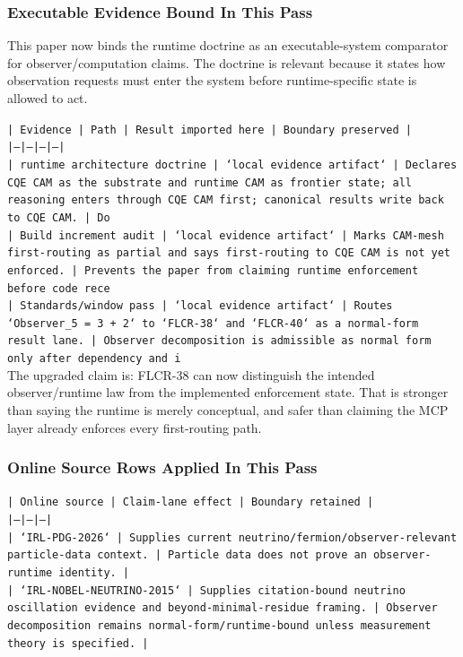 \documentclass[11pt]{article}
\begin{document}
\subsubsection*{Executable Evidence Bound In This Pass}

This paper now binds the runtime doctrine as an executable-system comparator for observer/computation claims. The doctrine is relevant because it states how observation requests must enter the system before runtime-specific state is allowed to act.

\noindent\texttt{| Evidence | Path | Result imported here | Boundary preserved |}\\
\noindent\texttt{|---|---|---|---|}\\
\noindent\texttt{| runtime architecture doctrine | `local evidence artifact` | Declares CQE CAM as the substrate and runtime CAM as frontier state; all reasoning enters through CQE CAM first; canonical results write back to CQE CAM. | Do}\\
\noindent\texttt{| Build increment audit | `local evidence artifact` | Marks CAM-mesh first-routing as partial and says first-routing to CQE CAM is not yet enforced. | Prevents the paper from claiming runtime enforcement before code rece}\\
\noindent\texttt{| Standards/window pass | `local evidence artifact` | Routes `Observer\_5 = 3 + 2` to `FLCR-38` and `FLCR-40` as a normal-form result lane. | Observer decomposition is admissible as normal form only after dependency and i}\\

The upgraded claim is: FLCR-38 can now distinguish the intended observer/runtime law from the implemented enforcement state. That is stronger than saying the runtime is merely conceptual, and safer than claiming the MCP layer already enforces every first-routing path.

\subsubsection*{Online Source Rows Applied In This Pass}

\noindent\texttt{| Online source | Claim-lane effect | Boundary retained |}\\
\noindent\texttt{|---|---|---|}\\
\noindent\texttt{| `IRL-PDG-2026` | Supplies current neutrino/fermion/observer-relevant particle-data context. | Particle data does not prove an observer-runtime identity. |}\\
\noindent\texttt{| `IRL-NOBEL-NEUTRINO-2015` | Supplies citation-bound neutrino oscillation evidence and beyond-minimal-residue framing. | Observer decomposition remains normal-form/runtime-bound unless measurement theory is specified. |}\\
\end{document}
